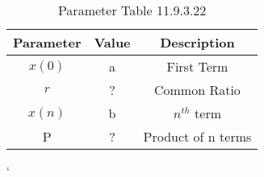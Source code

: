 
\begin{table}[ht]
  \centering
  \begin{tabular}{|c||c||c|}
    \hline
      Parameter & Value & Description  \\
    \hline
       $x(0)$ & a & First Term\\
     \hline
      $r$ & ? & Common Ratio \\
    \hline
    $x(n)$ & b & $n^{th}$ term\\
    \hline
     P & ? & Product of n terms\\
     \hline
  \end{tabular}
  \vspace{2mm}
  \caption{Parameter Table 11.9.3.22}
\end{table}`
